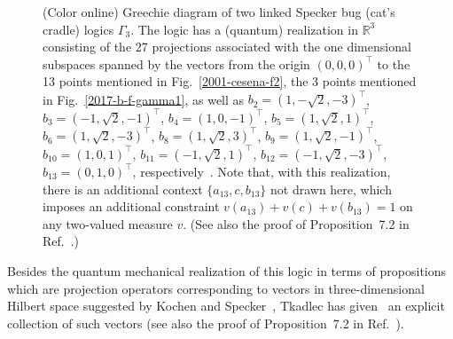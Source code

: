 \begin{figure}
\begin{center}
\begin{tabular}{c}
\end{tabular}
\end{center}
\caption{\label{2017-b-f-twobugs} (Color online) Greechie diagram of two linked Specker bug (cat's cradle) logics $\Gamma_3$.
The logic has a (quantum) realization in $\mathbb{R}^3$
consisting of the 27 projections associated with the one dimensional subspaces
spanned by  the vectors from the origin $\left(0,0,0\right)^\intercal$ to
the 13 points mentioned in Fig.~\ref{2001-cesena-f2},
the 3 points mentioned in Fig.~\ref{2017-b-f-gamma1}, as well as
$b_{2}     = \left(1, -\sqrt{2}, -3 \right)^\intercal $,
$b_{3}     = \left(    -1,\sqrt{2},-1     \right)^\intercal $,
$b_{4}     = \left(    1,0,-1     \right)^\intercal $,
$b_{5}     = \left(    1,\sqrt{2},1     \right)^\intercal $,
$b_{6}     = \left(1, \sqrt{2}, -3 \right)^\intercal $,
$b_{8}     = \left(1, \sqrt{2}, 3 \right)^\intercal $,
$b_{9}     = \left(    1,\sqrt{2},-1     \right)^\intercal $,
$b_{10}     = \left(    1,0,1     \right)^\intercal $,
$b_{11}     = \left(    -1,\sqrt{2},1     \right)^\intercal $,
$b_{12}     = \left(-1, \sqrt{2}, -3 \right)^\intercal $,
$b_{13}     = \left(    0,1,0     \right)^\intercal $,
respectively~\cite[p.~206, Fig.~1]{tkadlec-96}.
Note that, with this realization, there is an additional context $\{ a_{13},c,b_{13}\}$ not drawn here,
which imposes an additional constraint $v(a_{13})+v(c)+v(b_{13})=1$ on any two-valued measure $v$.
(See also the proof of Proposition~7.2 in Ref.~\cite[p.~5392]{svozil-tkadlec}.)
}
\end{figure}

Besides the  quantum mechanical realization of this logic in terms of propositions which are projection operators
corresponding to vectors in three-dimensional Hilbert space suggested by Kochen and Specker~\cite{kochen1},
Tkadlec has given~\cite[p.~206, Fig.~1]{tkadlec-96}  an explicit collection of such vectors
(see also the proof of Proposition~7.2 in Ref.~\cite[p.~5392]{svozil-tkadlec}).



